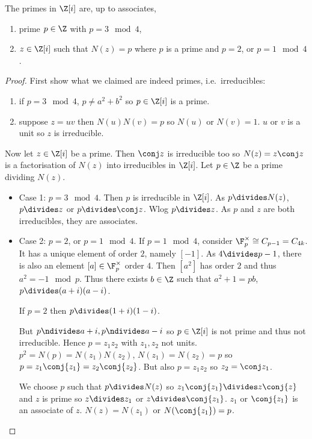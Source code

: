 \documentclass[a4paper]{article}
\theoremstyle{definition}
\begin{document}
\begin{proposition}
  The primes in \(\Z[i]\) are, up to associates,
  \begin{enumerate}
  \item prime \(p \in \Z\) with \(p = 3 \mod 4\),
  \item \(z \in \Z[i]\) such that \(N(z) = p\) where \(p\) is a prime and \(p = 2\), or \(p = 1 \mod 4\).
  \end{enumerate}
\end{proposition}

\begin{proof}
  First show what we claimed are indeed primes, i.e.\ irreducibles:
  \begin{enumerate}
  \item if \(p = 3 \mod 4\), \(p \neq a^2 + b^2\) so \(p \in \Z[i]\) is a prime.
  \item suppose \(z = uv\) then \(N(u)N(v) = p\) so \(N(u)\) or \(N(v) = 1\). \(u\) or \(v\) is a unit so \(z\) is irreducible.
  \end{enumerate}

  Now let \(z \in \Z[i]\) be a prime. Then \(\conj z\) is irreducible too so \(N(z) = z\conj z\) is a factorisation of \(N(z)\) into irreducibles in \(\Z[i]\). Let \(p \in \Z\) be a prime dividing \(N(z)\).
  \begin{itemize}
  \item Case 1: \(p = 3 \mod 4\). Then \(p\) is irreducible in \(\Z[i]\). As \(p \divides N(z)\), \(p \divides z\) or \(p \divides \conj z\). Wlog \(p \divides z\). As \(p\) and \(z\) are both irreducibles, they are associates.
  \item Case 2: \(p = 2\), or \(p = 1 \mod 4\). If \(p = 1 \mod 4\), consider \(\F_p^\times \cong C_{p - 1} = C_{4k}\). It has a unique element of order \(2\), namely \([-1]\). As \(4 \divides p - 1\), there is also an element \([a] \in \F_p^\times\) order \(4\). Then \([a^2]\) has order \(2\) and thus \(a^2 = -1 \mod p\). Thus there exists \(b \in \Z\) such that \(a^2 + 1 = pb\), \(p \divides (a + i)(a - i)\).

    If \(p = 2\) then \(p \divides (1 + i)(1 - i)\).

    But \(p \ndivides a + i, p \ndivides a - i\) so \(p \in \Z[i]\) is not prime and thus not irreducible. Hence \(p = z_1z_2\) with \(z_1, z_2\) not units. \(p^2 = N(p) = N(z_1)N(z_2)\), \(N(z_1) = N(z_2) = p\) so \(p = z_1\conj{z_1} = z_2\conj{z_2}\). But also \(p = z_1z_2\) so \(z_2 = \conj z_1\).

    We choose \(p\) such that \(p \divides N(z)\) so \(z_1\conj{z_1} \divides z \conj{z}\) and \(z\) is prime so \(z \divides z_1\) or \(z \divides \conj{z_1}\). \(z_1\) or \(\conj{z_1}\) is an associate of \(z\). \(N(z) = N(z_1)\) or \(N(\conj{z_1}) = p\).
  \end{itemize}
\end{proof}
\end{document}
